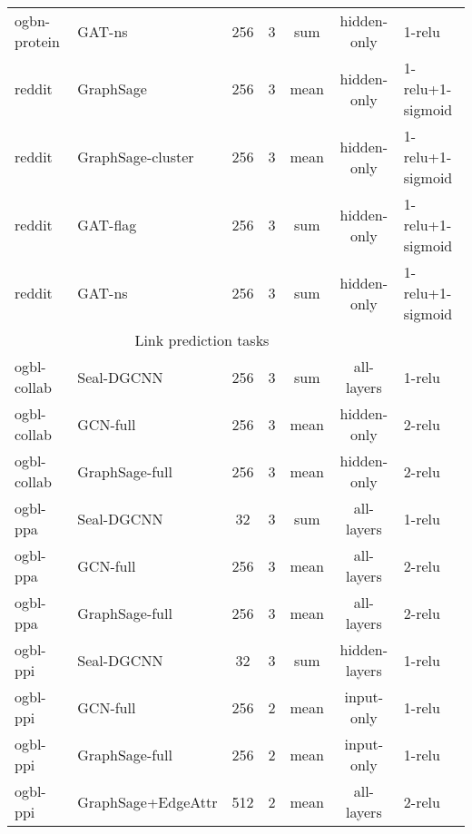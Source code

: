 \begin{table*}[t]
\begin{threeparttable}
\begin{tabular}{llccccl}
ogbn-protein & GAT-ns & 256 & 3 & sum & hidden-only & 1-relu\\
reddit & GraphSage & 256 & 3 & mean & hidden-only & 1-relu+1-sigmoid\\
reddit & GraphSage-cluster & 256 & 3 & mean & hidden-only & 1-relu+1-sigmoid\\
reddit & GAT-flag & 256 & 3 & sum & hidden-only & 1-relu+1-sigmoid\\
reddit & GAT-ns & 256 & 3 & sum & hidden-only & 1-relu+1-sigmoid\\
\midrule
\multicolumn{6}{c}{Link prediction tasks} \\
\midrule
ogbl-collab & Seal-DGCNN & 256 & 3 & sum & all-layers & 1-relu\\
ogbl-collab & GCN-full & 256 & 3 & mean & hidden-only & 2-relu\\
ogbl-collab & GraphSage-full & 256 & 3 & mean & hidden-only & 2-relu\\
ogbl-ppa & Seal-DGCNN & 32 & 3 & sum & all-layers & 1-relu\\
ogbl-ppa & GCN-full & 256 & 3 & mean & all-layers & 2-relu\\
ogbl-ppa & GraphSage-full & 256 & 3 & mean & all-layers & 2-relu\\
ogbl-ppi & Seal-DGCNN & 32 & 3 & sum & hidden-layers & 1-relu\\
ogbl-ppi & GCN-full & 256 & 2 &  mean & input-only & 1-relu \\
ogbl-ppi & GraphSage-full & 256 & 2 &  mean & input-only & 1-relu \\
ogbl-ppi & GraphSage+EdgeAttr & 512 & 2 & mean & all-layers & 2-relu \\
\bottomrule
\end{tabular}
\end{threeparttable}
\end{table*}

